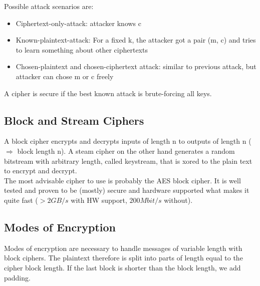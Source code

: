 Possible attack scenarios are:
\begin{itemize}[noitemsep, topsep=0pt]
  \item Ciphertext-only-attack: attacker knows c
  \item Known-plaintext-attack: For a fixed k, the attacker got a pair (m, c) and tries to learn something about other ciphertexts
  \item Chosen-plaintext and chosen-ciphertext attack: similar to previous attack, but attacker can chose m or c freely
\end{itemize}
\vspace{10pt}

A cipher is secure if the best known attack is brute-forcing all keys.

\subsection{Block and Stream Ciphers}
A block cipher encrypts and decrypts inputs of length n to outputs of length n ($\Rightarrow$ block length n).
A steam cipher on the other hand generates a random bitstream with arbitrary length, called keystream, that is xored to the plain text to encrypt and decrypt.\\
The most advisable cipher to use is probably the AES block cipher.
It is well tested and proven to be (mostly) secure and hardware supported what makes it quite fast ($>2GB/s$ with HW support, $200Mbit/s$ without).

\subsection{Modes of Encryption}
Modes of encryption are necessary to handle messages of variable length with block ciphers.
The plaintext therefore is split into parts of length equal to the cipher block length.
If the last block is shorter than the block length, we add padding.

